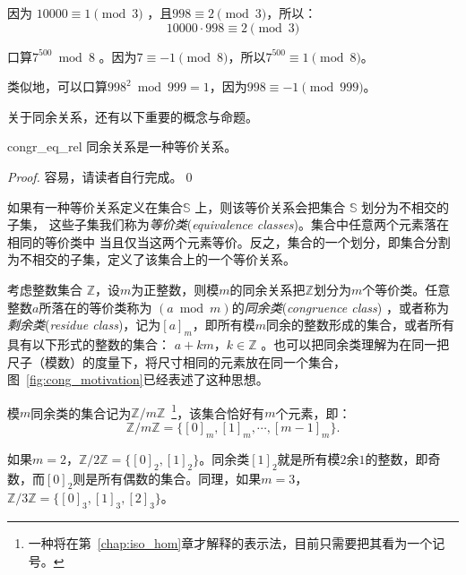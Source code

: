 \begin{example}
因为 $10000 \equiv 1 \pmod{3}$ ，且$998 \equiv 2 \pmod{3}$，所以：
\[ 10000 \cdot 998 \equiv 2 \pmod{3}\]
\end{example}

\begin{example}
口算$7^{500} \bmod 8$ 。因为$7 \equiv -1 \pmod{8}$，所以$7^{500} \equiv 1 \pmod{8} $。
\end{example}

类似地，可以口算$998^{2} \bmod 999 = 1$，因为$998 \equiv -1 \pmod{999}$。

关于同余关系，还有以下重要的概念与命题。
\begin{proposition}{}{congr_eq_rel}
同余关系是一种等价关系。
\end{proposition}
\begin{proof}
容易，请读者自行完成。\qed
\end{proof}

如果有一种等价关系定义在集合$\mathbb{S}$ 上，则该等价关系会把集合 $\mathbb{S}$ 划分为不相交的子集，
这些子集我们称为\emph{等价类}(\emph{equivalence classes})。集合中任意两个元素落在相同的等价类中
当且仅当这两个元素等价。反之，集合的一个划分，即集合分割为不相交的子集，定义了该集合上的一个等价关系。

考虑整数集合 $\mathbb{Z}$，设$m$为正整数，则模$m$的同余关系把$\mathbb{Z}$划分为$m$个等价类。任意整数$a$所落在的等价类称为
$(a \bmod m)$的\emph{同余类}(\emph{congruence class}) ，或者称为\emph{剩余类}(\emph{residue class})，记为$[a]_m$，即所有模$m$同余的整数形成的集合，或者所有具有以下形式的整数的集合：
$a + k m$，$k \in \mathbb{Z}$ 。也可以把同余类理解为在同一把尺子（模数）的度量下，将尺寸相同的元素放在同一个集合，图~\ref{fig:cong_motivation}已经表述了这种思想。%

模$m$同余类的集合记为$\mathbb{Z}/m\mathbb{Z}$~\footnote{一种将在第~\ref{chap:iso_hom}章才解释的表示法，目前只需要把其看为一个记号。}，该集合恰好有$m$个元素，即：
\[\mathbb{Z}/m\mathbb{Z} = \{[0]_m, [1]_m, \cdots, [m-1]_m\}.\]

\begin{example}
\label{exam:residue-class}
如果$m = 2$，$\mathbb{Z}/2\mathbb{Z} = \{[0]_2, [1]_2\}$。同余类$[1]_2$就是所有模$2$余$1$的整数，即奇数，而$[0]_2$则是所有偶数的集合。同理，如果$m = 3$，$\mathbb{Z}/3\mathbb{Z} = \{[0]_3, [1]_3, [2]_3\}$。
\end{example}

